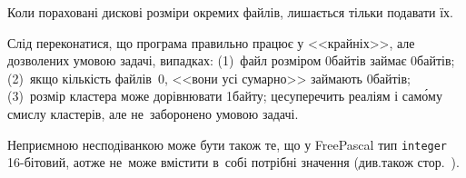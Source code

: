 Коли пораховані дискові розміри окремих файлів, лишається тільки подавати їх.

Слід переконатися, що програма правильно працює у <<крайніх>>, але дозволених умовою задачі, випадках: (1)~файл розміром 0\nolinebreak[3] байтів займає 0\nolinebreak[3] байтів; (2)~якщо кількість файлів~0, <<вони усі сумарно>> займають 0\nolinebreak[3] байтів; (3)~розмір кластера може дорівнювати 1\nolinebreak[3] байту; це\nolinebreak[3] суперечить реаліям і сам\'{о}му смислу кластерів, але не~заборонено умовою задачі.

Неприємною несподіванкою може бути також те, що у Free\nolinebreak[2] Pascal тип \texttt{integer} 16-бітовий, а\nolinebreak[2] отже не~може вмістити в~собі потрібні значення (див.\nolinebreak[3] також стор.~\pageref{text:overflow-example}).
